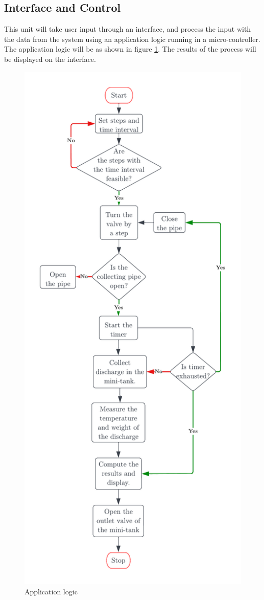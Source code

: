 \subsection{Interface and Control}
 This unit will take user input through an interface, and process the input with the data from the system using an application logic running in a micro-controller. The application logic will be as shown in figure \ref{fig:control_flow}. The results of the process will be displayed on the interface. 
\begin{figure}
    \centering
    \includegraphics[width=\textwidth,height=\textheight,keepaspectratio]{Figures/Control_flow.png}
    \caption{Application logic}
    \label{fig:control_flow}
\end{figure}
